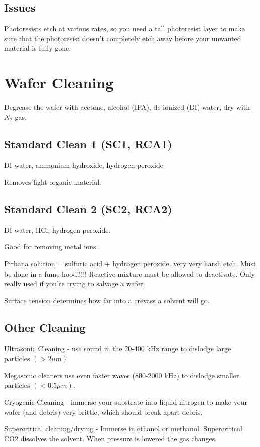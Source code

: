 \documentclass[fleqn]{report}
\begin{document}
\subsection{Issues}
Photoresists etch at various rates, so you need a tall photoresist layer 
to make sure that the photoresist doesn't completely etch away before your 
unwanted material is fully gone. 

\section{Wafer Cleaning}
Degrease the wafer with acetone, alcohol (IPA), de-ionized (DI) water, 
dry with $N_2$ gas. 

\subsection{Standard Clean 1 (SC1, RCA1)}
DI water, ammonium hydroxide, hydrogen peroxide 

Removes light organic material. 


\subsection{Standard Clean 2 (SC2, RCA2)}
DI water, HCl, hydrogen peroxide. 

Good for removing metal ions. 

Pirhana solution = sulfuric acid + hydrogen peroxide. 
very very harsh etch. 
Must be done in a fume hood!!!!!
Reactive mixture must be allowed to deactivate.
Only really used if you're trying to salvage a wafer.

Surface tension determines how far into a crevass a solvent 
will go.

\subsection{Other Cleaning}
Ultrasonic Cleaning - 
use sound in the 20-400 kHz range to dislodge large particles $(> 2 \mu m)$ 

Megasonic cleaners use even faster waves (800-2000 kHz) to dislodge 
smaller particles $(< 0.5 \mu m)$.

Cryogenic Cleaning - immerse your substrate into liquid nitrogen to make 
your wafer (and debris) very brittle, which should break apart debris.

Supercritical cleaning/drying - 
Immerse in ethanol or methanol. 
Supercritical CO2 dissolves the solvent. When pressure is lowered 
the gas changes.
\end{document}
